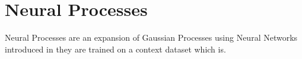 \documentclass[../main.tex]{subfiles}
\begin{document}
\section{Neural Processes}

Neural Processes are an expansion of Gaussian Processes using Neural Networks introduced in \cite{garnelo2018neural} they are trained on a context dataset which is.


\ifSubfilesClassLoaded{%
    \printbibliography{}
}{} 
\end{document}

